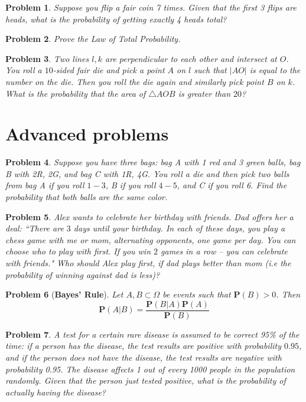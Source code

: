 \documentclass[a4paper,12pt]{article}
\theoremstyle{perfect}
\newtheorem{prb}{Problem}
\begin{document}
\begin{prb}
Suppose you flip a fair coin 7 times. Given that the first 3 flips are
heads, what is the probability of getting exactly 4 heads total?
\end{prb}

\begin{prb}
Prove the Law of Total Probability.
\end{prb}

\begin{prb}
Two lines $l, k$ are perpendicular to each other and intersect at $O$. You roll a $10$-sided fair die and pick a point $A$ on $l$ such that $|AO|$ is equal to the number on the die. Then you roll the die again and similarly pick point $B$ on $k$. What is the probability that the area of $\triangle AOB$ is greater than $20$? 
\end{prb}



\section{Advanced problems}

\begin{prb}
Suppose you have three bags: bag A with 1 red and 3 green balls, bag B with 2R, 2G, and bag C
with 1R, 4G. You roll a die and then pick two balls from bag A if you roll $1- 3$, B if you
roll $4-5$, and C if you roll 6. Find the probability that both balls are the same color.
\end{prb}

\begin{prb}
Alex wants to celebrate her birthday with friends. Dad offers her a deal: ``There are $3$ days until your birthday. In each of these days, you play a chess game with me or mom, alternating opponents, one game per day. You can choose who to play with first. If you win $2$ games in a row -- you can celebrate with friends."
Who should Alex play first, if dad plays better than mom (i.e the probability of winning against dad is less)? 
\end{prb}

\begin{prb}[\textbf{Bayes' Rule}]
Let $A, B \subset \Omega$ be events such that $\mathbf{P}(B) > 0$. Then
\begin{equation}
\mathbf{P}(A | B) = \frac{ \mathbf{P}(B |A)\mathbf{P}(A)}{\mathbf{P}(B)}
\end{equation}
\end{prb}

\begin{prb}
A test for a certain rare disease is assumed to be correct 95\% of the time: if a person has the disease, the test results are positive with probability $0.95$, and if the person does not have the disease, the test results are negative with probability 0.95. The disease affects 1 out of every 1000 people in the population randomly. Given that the person just tested positive, what is the probability of actually having the disease? 
\end{prb}


 
\end{document}
